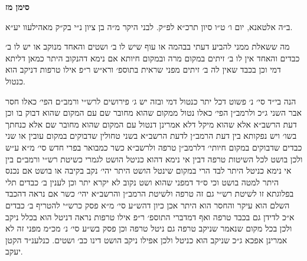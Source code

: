 \documentclass[12pt, openany]{book}
\newcommand{\chapname}{}
\newcommand{\newchap}[1]{
	\addcontentsline{toc}{chapter}{#1}
	\renewcommand{\chapname}{#1}
		\begin{center}
			\textbf{%
\fontsize{16pt}{16pt}\selectfont
				#1}
		\end{center}
}
\begin{document}
\begin{multicols}{2}
\end{multicols}\newpage

\newchap{סימן מז}
\begin{multicols}{2}
ב״ה אלטאנא, יום ו׳ ט״ו סיון תרכ״א לפ״ק. לבני היקר מ״ה בן ציון נ״י בק״ק מאהילעוו יע״א.\\\vspace{0pt}

מה ששאלת ממני להביע דעתי בבהמה או עוף שיש לו ב׳ ושטים והאחד מנוקב או יש לו ב׳ כבדים והאחד אין לו ב׳ זיתים במקום מרה ובמקום חיותא אם נימא דהנקוב היתר כמאן דליתא דמי וכן בכבד שאין לה ב׳ זיתים מפני שראית בתוספ׳ ורא״ש ר״פ אילו טרפות דניקב הוא כנטול.\\\vspace{0pt}

הנה בי״ד סי׳ נ׳ פשוט דכל יתר כנטול דמי ובזה יש ג׳ פירושים לרש״י ורמב״ם הפי׳ כאלו חסר אבר השני ג״כ ולרמב״ן הפי׳ כאלו נטול ממקום שהוא מחובר שם עם המקום שהוא דבוק בו וכן דעת הרשב״א אלא שהוא מיקל דלא אמרינן דנטול עם המקום שהוא מחובר שם אלא כנחתך בשו׳ ויש נפקותא בין דעת הרמב״ן לדעת הרשב״א בשני טחולין שדבוקים במקום עובין או שני כבדים שדבוקים במקום חיותי׳ דלרמב״ן טרפה ולרשב״א כשר כמבואר בפרי חדש סי׳ מ״א ע״ש ולכן בושט לכל השיטות טרפה דבין אי נימא דהוא כניטל הושט לגמרי כשיטת רש״י ורמב״ם בין אי נימא כניטל היתר לבד הרי במקום שינטל הושט היתר יהי׳ נקב בקיבה או בושט אם נכנס היתר למטה בושט וכי ס״ד דמפני שהוא ושט נקוב לא יקרא יתר וכן לענין ב׳ כבדים תלי בפלוגתא זו לשיטת רש״י גם זה טרפה ולשיטת הרמב״ן והרשב״א יהי׳ כשר אם נראה דהכבד השלם הוא עיקר והחסר הוא היתר אכן כיון דהש״ע סי׳ מ״א פסק כרש״י להטריף ב׳ כבדים א״כ לדידן גם בכבד טרפה ואף דמדברי התוספ׳ ר״פ אילו טרפות נראה דניטל הוא בכלל ניקב ולכן בכל מקום שנאמר שניקב טרפה גם ניטל טרפה וכן פסק בש״ע סי׳ נ׳ מכ״מ מפני זה לא אמרינן אפכא ג״כ שניקב הוא כניטל ולכן אפילו ניקב הושט דינו כב׳ ושטים. כנלענ״ד הקטן יעקב.\\\vspace{0pt}

\end{multicols}\newpage
\end{document}
